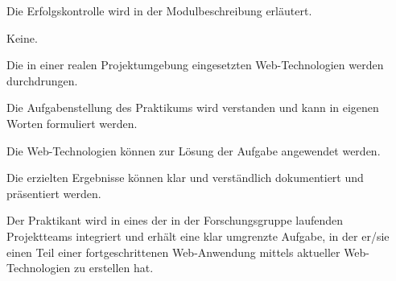\begin{course}

\setdoclanguagegerman
{}



\coursehead


\label{cour_5681.dp_997}


\begin{styleenv}
\begin{assessment}
Die Erfolgskontrolle wird in der Modulbeschreibung erläutert.


\end{assessment}

\begin{conditions}Keine.\end{conditions}


\end{styleenv}

\begin{learningoutcomes}
Die in einer realen Projektumgebung eingesetzten Web-Technologien werden durchdrungen.

 

Die Aufgabenstellung des Praktikums wird verstanden und kann in eigenen Worten formuliert werden.

 

Die Web-Technologien können zur Lösung der Aufgabe angewendet werden.

 

Die erzielten Ergebnisse können klar und verständlich dokumentiert und präsentiert werden.


\end{learningoutcomes}

\begin{content}
Der Praktikant wird in eines der in der Forschungsgruppe laufenden Projektteams integriert und erhält eine klar umgrenzte Aufgabe, in der er/sie einen Teil einer fortgeschrittenen Web-Anwendung mittels aktueller Web-Technologien zu erstellen hat.


\end{content}
\end{course}
